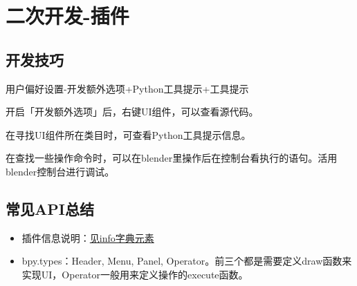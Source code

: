 \section{二次开发-插件}

\subsection{开发技巧}
用户偏好设置-开发额外选项+Python工具提示+工具提示

开启「开发额外选项」后，右键UI组件，可以查看源代码。

在寻找UI组件所在类目时，可查看Python工具提示信息。

在查找一些操作命令时，可以在blender里操作后在控制台看执行的语句。活用blender控制台进行调试。

\subsection{常见API总结}
\begin{itemize}
    \item 插件信息说明：\href{https://wiki.blender.org/wiki/Process/Addons/Guidelines/metainfo#Script_Meta_Info}{见info字典元素}
    \item bpy.types：Header, Menu, Panel, Operator。前三个都是需要定义draw函数来实现UI，Operator一般用来定义操作的execute函数。
\end{itemize}
